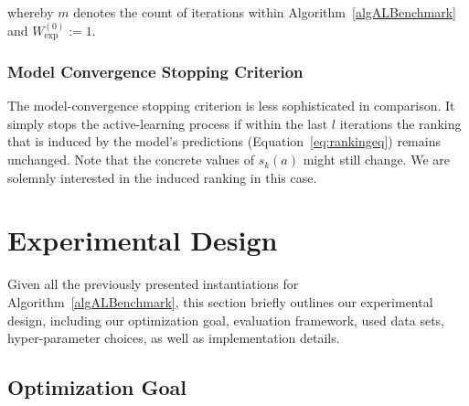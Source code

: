 \documentclass[runningheads]{llncs}
\begin{document}
whereby $m$ denotes the count of iterations within Algorithm~\ref{algALBenchmark} and $W_{\exp}^{\left(0\right)} := 1$.

\subsubsection{Model Convergence Stopping Criterion}

The model-convergence stopping criterion is less sophisticated in comparison.
It simply stops the active-learning process if within the last $l$ iterations the ranking that is induced by the model's predictions (Equation~\ref{eq:rankingeq}) remains unchanged.
Note that the concrete values of $s_k(a)$ might still change.
We are solemnly interested in the induced ranking in this case.


\section{Experimental Design}

Given all the previously presented instantiations for Algorithm~\ref{algALBenchmark}, this section briefly outlines our experimental design, including our optimization goal, evaluation framework, used data sets, hyper-parameter choices, as well as implementation details.

\subsection{Optimization Goal}
\label{sec:goal}
\end{document}
